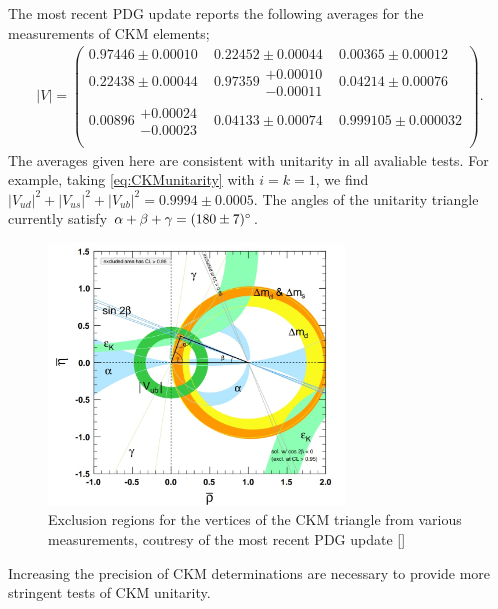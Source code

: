 The most recent PDG update \cite{PhysRevD.98.030001} reports the following averages for the measurements of CKM elements;
\begin{align}
  |V| = \begin{pmatrix}
    0.97446\pm 0.00010 & 0.22452\pm 0.00044 & 0.00365\pm 0.00012 \\
    0.22438\pm 0.00044 & 0.97359\substack{+0.00010\\-0.00011} & 0.04214\pm 0.00076 \\
    0.00896\substack{+0.00024\\-0.00023} & 0.04133\pm 0.00074 & 0.999105\pm 0.000032 \\
    \end{pmatrix}.
\end{align}
The averages given here are consistent with unitarity in all avaliable tests. For example, taking \eqref{eq:CKMunitarity} with $i=k=1$, we find $|V_{ud}|^2+|V_{us}|^2+|V_{ub}|^2 = 0.9994\pm 0.0005$. The angles of the unitarity triangle currently satisfy $\alpha+\beta+\gamma = (180\pm 7)\degree$.

\begin{figure}
  \vspace{-10pt}
  \begin{center}
    \includegraphics[width=0.7\textwidth]{images/ckmpdg.jpg}
  \end{center}
  \vspace{-25pt}
  \caption{Exclusion regions for the vertices of the CKM triangle from various measurements, coutresy of the most recent PDG update [{\red{!}}]}
  \label{fig:ckmpdg}
\end{figure}

Increasing the precision of CKM determinations are necessary to provide more stringent tests of CKM unitarity.

